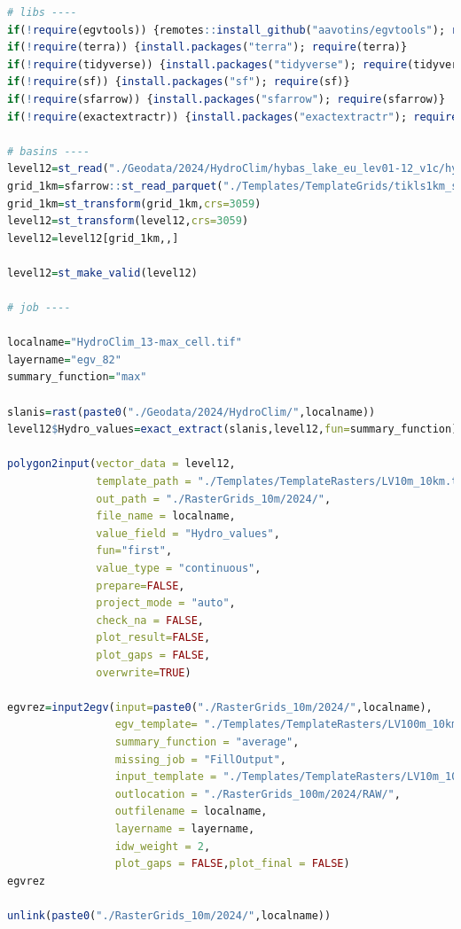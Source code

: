 \documentclass[
]{book}
\begin{document}
\begin{lstlisting}[language=R]
# libs ----
if(!require(egvtools)) {remotes::install_github("aavotins/egvtools"); require(egvtools)}
if(!require(terra)) {install.packages("terra"); require(terra)}
if(!require(tidyverse)) {install.packages("tidyverse"); require(tidyverse)}
if(!require(sf)) {install.packages("sf"); require(sf)}
if(!require(sfarrow)) {install.packages("sfarrow"); require(sfarrow)}
if(!require(exactextractr)) {install.packages("exactextractr"); require(exactextractr)}

# basins ----
level12=st_read("./Geodata/2024/HydroClim/hybas_lake_eu_lev01-12_v1c/hybas_lake_eu_lev12_v1c.shp")
grid_1km=sfarrow::st_read_parquet("./Templates/TemplateGrids/tikls1km_sauzeme.parquet")
grid_1km=st_transform(grid_1km,crs=3059)
level12=st_transform(level12,crs=3059)
level12=level12[grid_1km,,]

level12=st_make_valid(level12)

# job ----

localname="HydroClim_13-max_cell.tif"
layername="egv_82"
summary_function="max"
  
slanis=rast(paste0("./Geodata/2024/HydroClim/",localname))
level12$Hydro_values=exact_extract(slanis,level12,fun=summary_function)
  
polygon2input(vector_data = level12,
              template_path = "./Templates/TemplateRasters/LV10m_10km.tif",
              out_path = "./RasterGrids_10m/2024/",
              file_name = localname,
              value_field = "Hydro_values",
              fun="first",
              value_type = "continuous",
              prepare=FALSE,
              project_mode = "auto",
              check_na = FALSE,
              plot_result=FALSE,
              plot_gaps = FALSE,
              overwrite=TRUE)
  
egvrez=input2egv(input=paste0("./RasterGrids_10m/2024/",localname),
                 egv_template= "./Templates/TemplateRasters/LV100m_10km.tif",
                 summary_function = "average",
                 missing_job = "FillOutput",
                 input_template = "./Templates/TemplateRasters/LV10m_10km.tif",
                 outlocation = "./RasterGrids_100m/2024/RAW/",
                 outfilename = localname,
                 layername = layername,
                 idw_weight = 2,
                 plot_gaps = FALSE,plot_final = FALSE)
egvrez
  
unlink(paste0("./RasterGrids_10m/2024/",localname))
\end{lstlisting}
\end{document}
